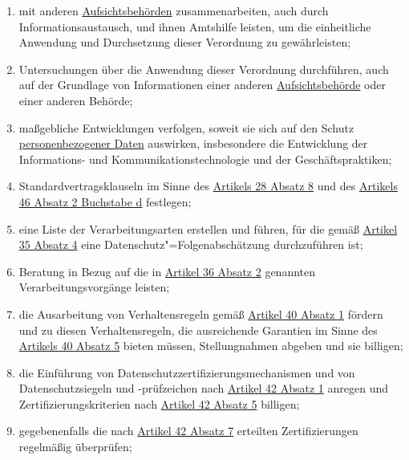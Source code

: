 \begin{enumerate}
\begin{enumerate}
    \item mit anderen \hyperref[itm:04-21]{Aufsichtsbehörden} zusammenarbeiten, auch durch Informationsaustausch, und
     ihnen Amtshilfe leisten, um die einheitliche Anwendung und Durchsetzung dieser Verordnung zu gewährleisten;%
    \label{itm:57-1g}

    \item Untersuchungen über die Anwendung dieser Verordnung durchführen, auch auf der Grundlage von Informationen
     einer anderen \hyperref[itm:04-21]{Aufsichtsbehörde} oder einer anderen Behörde;%
    \label{itm:57-1h}

    \item maßgebliche Entwicklungen verfolgen, soweit sie sich auf den Schutz \hyperref[itm:04-1]
     {personenbezogener Daten} auswirken, insbesondere die Entwicklung der Informations- und Kommunikationstechnologie
     und der Geschäftspraktiken;%
    \label{itm:57-1i}

    \item Standardvertragsklauseln im Sinne des \hyperref[itm:28-8]{Artikels 28 Absatz 8} und des \hyperref[itm:46-2d]
     {Artikels 46 Absatz 2 Buchstabe d} festlegen;%
    \label{itm:57-1j}

    \item eine Liste der Verarbeitungsarten erstellen und führen, für die gemäß \hyperref[itm:35-4]{Artikel 35 Absatz 4}
     eine Datenschutz"=Folgenabschätzung durchzuführen ist;%
    \label{itm:57-1k}

    \item Beratung in Bezug auf die in \hyperref[itm:36-1]{Artikel 36 Absatz 2} genannten Verarbeitungsvorgänge
     leisten;%
    \label{itm:57-1l}

    \item die Ausarbeitung von Verhaltensregeln gemäß \hyperref[itm:40-1]{Artikel 40 Absatz 1} fördern und zu diesen
     Verhaltensregeln, die ausreichende Garantien im Sinne des \hyperref[itm:40-5]{Artikels 40 Absatz 5} bieten müssen,
     Stellungnahmen abgeben und sie billigen;%
    \label{itm:57-1m}

    \item die Einführung von Datenschutzzertifizierungsmechanismen und von Datenschutzsiegeln und -prüfzeichen nach
     \hyperref[itm:42-1]{Artikel 42 Absatz 1} anregen und Zertifizierungskriterien nach \hyperref[itm:42-5]{Artikel 42
      Absatz 5} billigen;%
    \label{itm:57-1n}

    \item gegebenenfalls die nach \hyperref[itm:42-7]{Artikel 42 Absatz 7} erteilten Zertifizierungen regelmäßig
     überprüfen;%
    \label{itm:57-1o}


\end{enumerate}
\end{enumerate}

